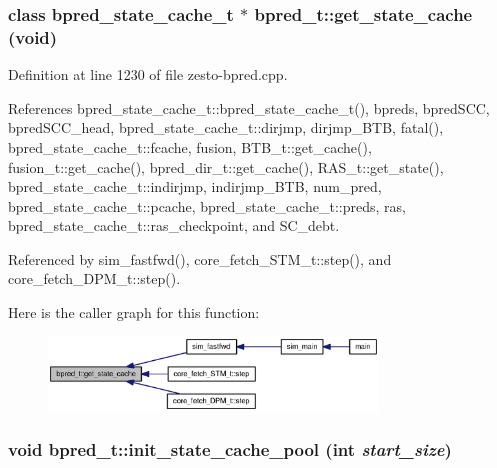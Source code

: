 \subsubsection[{get\_\-state\_\-cache}]{\setlength{\rightskip}{0pt plus 5cm}class {\bf bpred\_\-state\_\-cache\_\-t} $\ast$ bpred\_\-t::get\_\-state\_\-cache (void)}\label{classbpred__t_48647ea733ca43990ea2a9b8c4d03ab8}




Definition at line 1230 of file zesto-bpred.cpp.

References bpred\_\-state\_\-cache\_\-t::bpred\_\-state\_\-cache\_\-t(), bpreds, bpredSCC, bpredSCC\_\-head, bpred\_\-state\_\-cache\_\-t::dirjmp, dirjmp\_\-BTB, fatal(), bpred\_\-state\_\-cache\_\-t::fcache, fusion, BTB\_\-t::get\_\-cache(), fusion\_\-t::get\_\-cache(), bpred\_\-dir\_\-t::get\_\-cache(), RAS\_\-t::get\_\-state(), bpred\_\-state\_\-cache\_\-t::indirjmp, indirjmp\_\-BTB, num\_\-pred, bpred\_\-state\_\-cache\_\-t::pcache, bpred\_\-state\_\-cache\_\-t::preds, ras, bpred\_\-state\_\-cache\_\-t::ras\_\-checkpoint, and SC\_\-debt.

Referenced by sim\_\-fastfwd(), core\_\-fetch\_\-STM\_\-t::step(), and core\_\-fetch\_\-DPM\_\-t::step().

Here is the caller graph for this function:\nopagebreak
\begin{figure}[H]
\begin{center}
\leavevmode
\includegraphics[width=248pt]{classbpred__t_48647ea733ca43990ea2a9b8c4d03ab8_icgraph}
\end{center}
\end{figure}
\subsubsection[{init\_\-state\_\-cache\_\-pool}]{\setlength{\rightskip}{0pt plus 5cm}void bpred\_\-t::init\_\-state\_\-cache\_\-pool (int {\em start\_\-size})\hspace{0.3cm}{\tt  [private]}}\label{classbpred__t_20daf02e6bf98c4ab5ee282b22e735c3}




